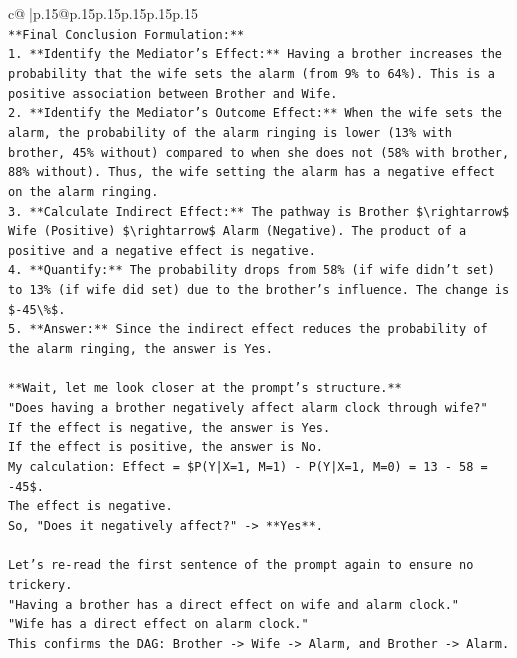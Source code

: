 \documentclass{article}
\begin{document}
{\begin{supertabular}{c@{$\;$}|p{.15\linewidth}@{}p{.15\linewidth}p{.15\linewidth}p{.15\linewidth}p{.15\linewidth}p{.15\linewidth}}
{{{\\ 
\texttt{**Final Conclusion Formulation:**} \\
\texttt{1.  **Identify the Mediator's Effect:** Having a brother increases the probability that the wife sets the alarm (from 9\% to 64\%). This is a positive association between Brother and Wife.} \\
\texttt{2.  **Identify the Mediator's Outcome Effect:** When the wife sets the alarm, the probability of the alarm ringing is lower (13\% with brother, 45\% without) compared to when she does not (58\% with brother, 88\% without). Thus, the wife setting the alarm has a negative effect on the alarm ringing.} \\
\texttt{3.  **Calculate Indirect Effect:** The pathway is Brother \$\textbackslash{}rightarrow\$ Wife (Positive) \$\textbackslash{}rightarrow\$ Alarm (Negative). The product of a positive and a negative effect is negative.} \\
\texttt{4.  **Quantify:** The probability drops from 58\% (if wife didn't set) to 13\% (if wife did set) due to the brother's influence. The change is \${-}45\textbackslash{}\%\$.} \\
\texttt{5.  **Answer:** Since the indirect effect reduces the probability of the alarm ringing, the answer is Yes.} \\
\\ 
\texttt{**Wait, let me look closer at the prompt's structure.**} \\
\texttt{"Does having a brother negatively affect alarm clock through wife?"} \\
\texttt{If the effect is negative, the answer is Yes.} \\
\texttt{If the effect is positive, the answer is No.} \\
\texttt{My calculation: Effect = \$P(Y|X=1, M=1) {-} P(Y|X=1, M=0) = 13 {-} 58 = {-}45\$.} \\
\texttt{The effect is negative.} \\
\texttt{So, "Does it negatively affect?" {-}> **Yes**.} \\
\\ 
\texttt{Let's re{-}read the first sentence of the prompt again to ensure no trickery.} \\
\texttt{"Having a brother has a direct effect on wife and alarm clock."} \\
\texttt{"Wife has a direct effect on alarm clock."} \\
\texttt{This confirms the DAG: Brother {-}> Wife {-}> Alarm, and Brother {-}> Alarm.} \\
}}}
\end{supertabular}}
\end{document}
